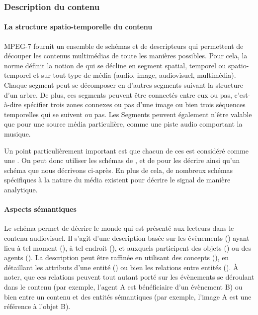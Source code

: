 \subsubsection{Description du contenu}
\paragraph{La structure spatio-temporelle du contenu}
MPEG-7 fournit un ensemble de schémas et de descripteurs qui permettent de découper les contenus multimédias de toute les manières possibles. 
Pour cela, la norme définit la notion de  qui se décline en segment spatial, temporel ou spatio-temporel et sur tout type de média (audio, image, audiovisuel, multimédia). 
Chaque segment peut se décomposer en d'autres segments suivant la structure d'un arbre. 
De plus, ces segments peuvent être connectés entre eux ou pas, c'est-à-dire spécifier trois zones connexes ou pas d'une image ou bien trois séquences temporelles qui se suivent ou pas. 
Les Segments peuvent également n'être valable que pour une source média particulière, comme une piste audio comportant la musique.

Un point particulièrement important est que chacun de ces  est considéré comme une . 
On peut donc utiliser les schémas de ,  et de  pour les décrire ainsi qu'un schéma  que nous décrivons ci-après. 
En plus de cela, de nombreux schémas spécifiques à la nature du média existent pour décrire le signal de manière analytique. 


\paragraph{Aspects sémantiques}
Le schéma  permet de décrire le monde qui est présenté aux lecteurs dans le contenu audiovisuel. 
Il s'agit d'une description basée sur les évènements () ayant lieu à tel moment (), à tel endroit (), et auxquels participent des objets () ou des agents (). 
La description peut être raffinée en utilisant des concepts (), en détaillant les attributs d'une entité () ou bien les relations entre entités ().
À noter, que ces relations peuvent tout autant porté sur les évènements se déroulant dans le contenu (par exemple, l'agent A est bénéficiaire d'un évènement B) ou bien entre un contenu et des entités sémantiques (par exemple, l'image A est une référence à l'objet B).

